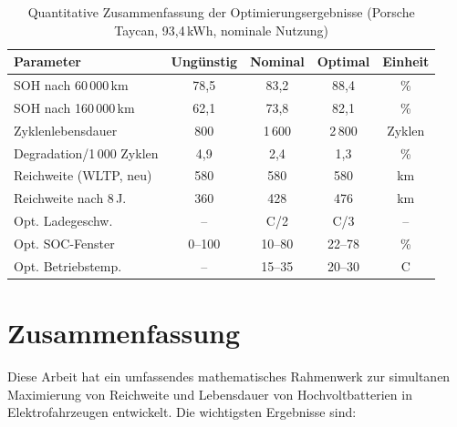 ﻿\documentclass[a4paper,12pt]{article}
\newcommand{\degC}{\textdegree{}C}
\theoremstyle{definition}
\begin{document}
\begin{table}[H]
  \centering
  \caption{Quantitative Zusammenfassung der Optimierungsergebnisse
    (Porsche Taycan, 93{,}4\,kWh, nominale Nutzung)}
  \label{tab:ergebnisse}
  \begin{tabular}{lcccc}
    \toprule
    \textbf{Parameter} & \textbf{Ung\"unstig} & \textbf{Nominal}
      & \textbf{Optimal} & \textbf{Einheit} \\
    \midrule
    SOH nach 60\,000\,km   & 78{,}5 & 83{,}2 & 88{,}4 & \% \\
    SOH nach 160\,000\,km  & 62{,}1 & 73{,}8 & 82{,}1 & \% \\
    Zyklenlebensdauer      & 800    & 1\,600 & 2\,800 & Zyklen \\
    Degradation/1\,000 Zyklen & 4{,}9  & 2{,}4  & 1{,}3  & \% \\
    Reichweite (WLTP, neu) & 580    & 580    & 580    & km \\
    Reichweite nach 8\,J.  & 360    & 428    & 476    & km \\
    Opt. Ladegeschw.       & --     & C/2    & C/3    & -- \\
    Opt. SOC-Fenster       & 0--100 & 10--80 & 22--78 & \% \\
    Opt. Betriebstemp.     & --     & 15--35 & 20--30 & \degC{} \\
    \bottomrule
  \end{tabular}
\end{table}

\section{Zusammenfassung}

Diese Arbeit hat ein umfassendes mathematisches Rahmenwerk zur simultanen
Maximierung von Reichweite und Lebensdauer von Hochvoltbatterien in
Elektrofahrzeugen entwickelt. Die wichtigsten Ergebnisse sind:
\end{document}
